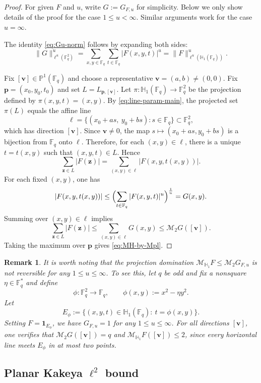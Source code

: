 \documentclass[11pt]{article}
\newtheorem{remark}[theorem]{Remark}
\newcommand{\1}{\mathbf 1}
\begin{document}
\begin{proof}
For given $F$ and $u$, write $G:=G_{F,u}$ for simplicity. Below we only show details of the proof for the case $1\leq u<\infty$. Similar arguments work for the case $u=\infty$. 

The identity \eqref{eq:Gu-norm} follows by expanding both sides:
\[
\|G\|_{\ell^u(\mathbb{F}_q^2)}^u
=
\sum_{x,y \in \mathbb{F}_q}\sum_{t \in \mathbb{F}_q} |F(x,y,t)|^u
=
\|F\|_{\ell^u(\mathbb{H}_1(\mathbb{F}_q))}^u.
\]

Fix $[\mathbf{v}]\in\mathbb{P}^1(\mathbb{F}_q)$ and choose a representative $\mathbf{v}=(a,b)\neq (0,0)$. Fix $\mathbf{p}=(x_0,y_0,t_0)$ and set $L=L_{\mathbf{p}, [\mathbf{v}]}$. Let $\pi:\mathbb H_1(\mathbb F_q)\to\mathbb F_q^2$ be the projection defined by $\pi(x,y,t)=(x,y)$. 
By \eqref{eq:line-param-main}, the projected set $\pi(L)$ equals the affine line
\[
\ell=\{(x_0+as,\ y_0+bs):s\in\mathbb{F}_q\}\subset \mathbb{F}_q^2,
\]
which has direction $[\mathbf{v}]$. Since $\mathbf{v}\neq 0$, the map $s\mapsto (x_0+as,y_0+bs)$ is a bijection from $\mathbb{F}_q$ onto $\ell$.
Therefore, for each $(x,y)\in \ell$, there is a unique $t=t(x,y)$ such that $(x,y,t)\in L$. Hence
\[
\sum_{\mathbf{z}\in L}|F(\mathbf{z})|
=
\sum_{(x,y)\in \ell} |F(x,y,t(x,y))|.
\]
For each fixed $(x,y)$, one has
\[
|F(x,y,t(x,y))|
\le
\Bigl(\sum_{t\in\mathbb{F}_q}|F(x,y,t)|^u\Bigr)^{\frac{1}{u}}
=
G(x,y).
\]
Summing over $(x,y)\in\ell$ implies
\[
\sum_{\mathbf{z}\in L}|F(\mathbf{z})|
\le
\sum_{(x,y)\in \ell} G(x,y)
\le
\mathcal{M}_{2}G([\mathbf{v}]).
\]
Taking the maximum over $\mathbf{p}$ gives \eqref{eq:MH-by-Mpl}. 
\end{proof}


\begin{remark}\label{goodremark}
It is worth noting that the projection domination $\mathcal M_{\mathbb{H}_1} F\le \mathcal M_2G_{F,u}$ is not reversible for any $1\leq u\leq \infty$. To see this, let $q$ be odd and fix a nonsquare $\eta\in\mathbb F_q^*$ and define
\[
\phi:\mathbb F_q^2\to\mathbb F_q,
\qquad
\phi(x,y):=x^2-\eta y^2.
\]
Let
\[
E_\phi:=\{(x,y,t)\in\mathbb H_1(\mathbb F_q):\ t=\phi(x,y)\}.
\]
Setting $F=\mathbf 1_{E_\phi}$, we have $G_{F,u}=1$ for any $1\leq u\leq \infty$. For all directions $[\mathbf{v}]$, one verifies that $\mathcal M_2G([\mathbf v])= q$ and $\mathcal M_{\mathbb{H}_1} F([\mathbf v])\le 2$, since every horizontal line meets $E_\phi$ in at most two points. 
\end{remark}

\subsection{Planar Kakeya $\ell^2$ bound}
\end{document}
